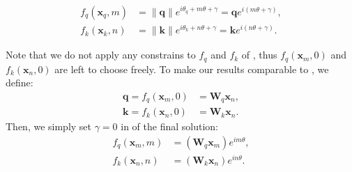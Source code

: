 \documentclass{article}
\def\q{{\boldsymbol q}}
\def\k{{\boldsymbol k}}
\def\x{{\boldsymbol x}}
\def\W{{\boldsymbol W}}
\begin{document}
\begin{equation}
	\begin{aligned}
		f_q(\x_q, m) &= \|\q\|e^{i\theta_q + m\theta + \gamma} = \q e^{i(m\theta + \gamma)}, \\
		f_k(\x_k, n) &= \|\k\|e^{i\theta_k + n\theta + \gamma}= \k e^{i(n\theta + \gamma)}.
	\end{aligned} 
	\label{fn:deri-solution1}
\end{equation}

Note that we do not apply any constrains to $f_q$ and $f_k$ of , thus $f_q(\x_m, 0)$ and $f_k(\x_n, 0)$ are left to choose freely. To make our results comparable to , we define:
\begin{equation}
	\begin{aligned}
		\q = f_q(\x_m, 0) &= \W_q\x_n,\\
		\k = f_k(\x_n, 0) &= \W_k\x_n.
	\end{aligned}
\end{equation}
Then, we simply set $\gamma = 0$ in  of the final solution: 
\begin{equation}
	\begin{aligned}
		f_q(\x_m, m) &= (\W_q\x_m)e^{im\theta},\\
		f_k(\x_n, n) &= (\W_k\x_n)e^{in\theta}.
	\end{aligned}
\end{equation}
\end{document}
